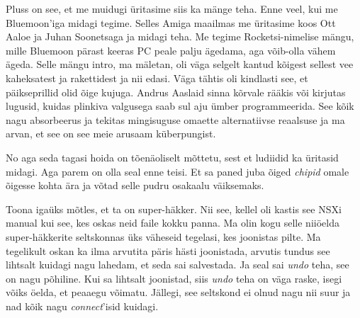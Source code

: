 Pluss on see, et me muidugi üritasime  siis ka mänge teha. Enne veel, kui me Bluemoon'iga  midagi tegime. Selles Amiga maailmas me üritasime koos Ott Aaloe ja Juhan Soonetsaga ja midagi teha. Me tegime Rocketsi-nimelise mängu, mille Bluemoon pärast keeras PC peale palju ägedama, aga võib-olla vähem ägeda. Selle mängu intro, ma mäletan, oli väga selgelt kantud kõigest sellest vee kaheksatest ja rakettidest ja nii edasi. Väga tähtis oli kindlasti see, et päikseprillid olid õige kujuga. Andrus Aaslaid sinna kõrvale rääkis või kirjutas lugusid, kuidas plinkiva valgusega saab sul aju ümber programmeerida. See kõik nagu absorbeerus ja tekitas mingisuguse omaette alternatiivse reaalsuse ja ma arvan, et see on see meie arusaam küberpungist. 


No aga seda tagasi hoida on tõenäoliselt mõttetu, sest et ludiidid ka üritasid midagi. Aga parem on olla seal enne teisi. Et sa paned juba õiged \emph{chipid} omale õigesse kohta  ära ja võtad selle pudru osakaalu väiksemaks. 


Toona igaüks mõtles, et ta on super-häkker. Nii see, kellel oli kastis see NSXi manual kui see, kes oskas neid faile kokku panna. Ma olin kogu selle niiöelda super-häkkerite seltskonnas üks väheseid tegelasi, kes joonistas pilte. Ma  tegelikult oskan ka ilma arvutita päris hästi joonistada, arvutis tundus see lihtsalt  kuidagi nagu lahedam, et seda sai salvestada. Ja  seal sai \emph{undo} teha, see on nagu põhiline. Kui sa lihtsalt joonistad, siis \emph{undo} teha on väga raske, isegi võiks öelda, et peaaegu võimatu. Jällegi, see seltskond ei olnud nagu nii suur ja nad kõik nagu \emph{connect}'isid kuidagi. 

